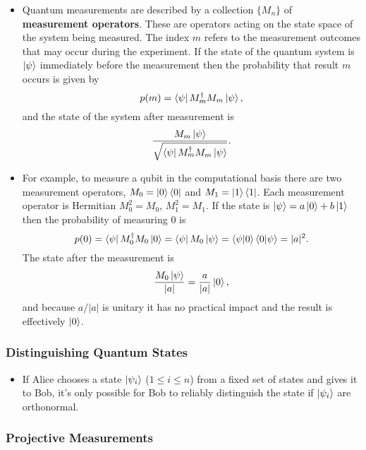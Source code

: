 \documentclass{article}
\begin{document}
\begin{itemize}
  \item Quantum measurements are described by a collection $\{M_n\}$ of \textbf{measurement operators}. These are operators acting on the state space of the system being measured. The index $m$ refers to the measurement outcomes that may occur during the experiment. If the state of the quantum system is $\ket{\psi}$ immediately before the measurement then the probability that result $m$ occurs is given by \[p(m) = \bra{\psi} M_m^\dagger M_m \ket{\psi},\] and the state of the system after measurement is \[\frac{M_m \ket{\psi}}{\sqrt{\bra{\psi} M_m^\dagger M_m \ket{\psi}}}.\]

  \item For example, to measure a qubit in the computational basis there are two measurement operators, $M_0 = \ket{0} \bra{0}$ and $M_1 = \ket{1} \bra{1}$. Each measurement operator is Hermitian $M_0^2 = M_0$, $M_1^2 = M_1$. If the state is $\ket{\psi} = a \ket{0} + b \ket{1}$ then the probability of measuring $0$ is \[p(0) = \bra{\psi} M_0^\dagger M_0 \ket{0} = \bra{\psi} M_0 \ket{\psi} = \braket{\psi | 0} \braket{0 | \psi} = |a|^2.\] The state after the measurement is \[\frac{M_0 \ket{\psi}}{|a|} = \frac{a}{|a|} \ket{0},\] and because $a / |a|$ is unitary it has no practical impact and the result is effectively $\ket{0}$.
\end{itemize}

\subsubsection{Distinguishing Quantum States}

\begin{itemize}
  \item If Alice chooses a state $\ket{\psi_i}$ ($1 \le i \le n$) from a fixed set of states and gives it to Bob, it's only possible for Bob to reliably distinguish the state if $\ket{\psi_i}$ are orthonormal.
\end{itemize}

\subsubsection{Projective Measurements}
\end{document}
